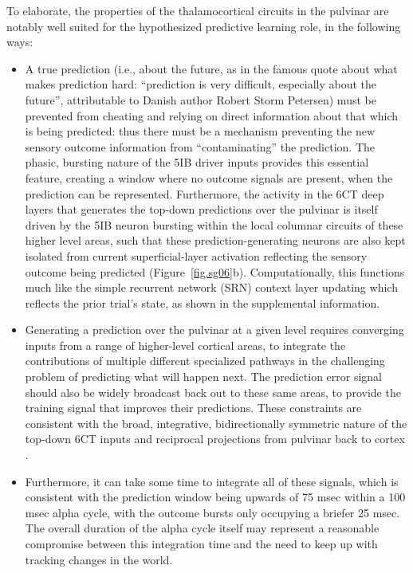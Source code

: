 \documentclass[11pt,twoside]{article}
\newif\myifpdf
\begin{document}
To elaborate, the properties of the thalamocortical circuits in the pulvinar are notably well suited for the hypothesized predictive learning role, in the following ways:
\begin{itemize}
	\item A true prediction (i.e., about the future, as in the famous quote about what makes prediction hard: ``prediction is very difficult, especially about the future'', attributable to Danish author Robert Storm Petersen) must be prevented from cheating and relying on direct information about that which is being predicted: thus there must be a mechanism preventing the new sensory outcome information from ``contaminating'' the prediction.  The phasic, bursting nature of the 5IB driver inputs provides this essential feature, creating a window where no outcome signals are present, when the prediction can be represented.  Furthermore, the activity in the 6CT deep layers that generates the top-down predictions over the pulvinar is itself driven by the 5IB neuron bursting within the local columnar circuits of these higher level areas, such that these prediction-generating neurons are also kept isolated from current superficial-layer activation reflecting the sensory outcome being predicted (Figure~\ref{fig.sg06}b).  Computationally, this functions much like the simple recurrent network (SRN) context layer updating \cite{Elman90,Jordan89} which reflects the prior trial's state, as shown in the supplemental information.
	\item Generating a prediction over the pulvinar at a given level requires converging inputs from a range of higher-level cortical areas, to integrate the contributions of multiple different specialized pathways in the challenging problem of predicting what will happen next.  The prediction error signal should also be widely broadcast back out to these same areas, to provide the training signal that improves their predictions.  These constraints are consistent with the broad, integrative, bidirectionally symmetric nature of the top-down 6CT inputs and reciprocal projections from pulvinar back to cortex \cite{Shipp03,Mumford91}.
	\item Furthermore, it can take some time to integrate all of these signals, which is consistent with the prediction window being upwards of 75 msec within a 100 msec alpha cycle, with the outcome bursts only occupying a briefer 25 msec.  The overall duration of the alpha cycle itself may represent a reasonable compromise between this integration time and the need to keep up with tracking changes in the world.

\end{itemize}
\end{document}

